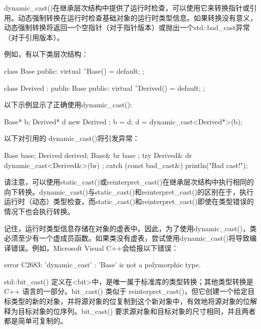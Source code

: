 
dynamic\_cast()在继承层次结构中提供了运行时检查，可以使用它来转换指针或引用。动态强制转换在运行时检查基础对象的运行时类型信息。如果转换没有意义，动态强制转换将返回一个空指针（对于指针版本）或抛出一个std::bad\_cast异常（对于引用版本）。

例如，有以下类层次结构：

\begin{cpp}
class Base
{
    public:
        virtual ˜Base() = default;
};

class Derived : public Base
{
    public:
        virtual ˜Derived() = default;
};
\end{cpp}

以下示例显示了正确使用dynamic\_cast():

\begin{cpp}
Base* b;
Derived* d { new Derived {} };
b = d;
d = dynamic_cast<Derived*>(b);
\end{cpp}

以下对引用的 dynamic\_cast()将引发异常：

\begin{cpp}
Base base;
Derived derived;
Base& br { base };
try {
    Derived& dr { dynamic_cast<Derived&>(br) };
} catch (const bad_cast&) {
    println("Bad cast!");
}
\end{cpp}

请注意，可以使用static\_cast()或reinterpret\_cast()在继承层次结构中执行相同的向下转换。dynamic\_cast()与static\_cast()和reinterpret\_cast()的区别在于，执行运行时（动态）类型检查，而static\_cast()和reinterpret\_cast()即使在类型错误的情况下也会执行转换。

记住，运行时类型信息存储在对象的虚表中。因此，为了使用dynamic\_cast()，类必须至少有一个虚成员函数。如果类没有虚表，尝试使用dynamic\_cast()将导致编译错误。例如，Microsoft Visual C++会给报以下错误：

\begin{shell}
error C2683: 'dynamic_cast' : 'Base' is not a polymorphic type.
\end{shell}


std::bit\_cast() 定义在<bit>中，是唯一属于标准库的类型转换；其他类型转换是 C++ 语言的一部分。bit\_cast() 类似于 reinterpret\_cast()，但它创建一个给定目标类型的新的对象，并将源对象的位复制到这个新对象中，有效地将源对象的位解释为目标对象的位序列。bit\_cast() 要求源对象和目标对象的尺寸相同，并且两者都是简单可复制的。

